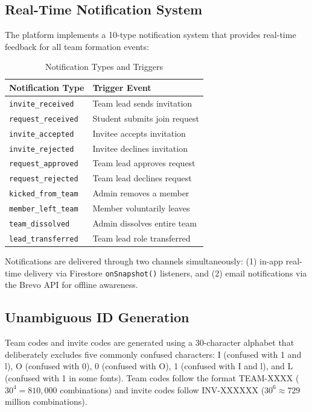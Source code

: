 \documentclass[12pt,a4paper]{article}
\begin{document}
\subsection{Real-Time Notification System}

The platform implements a 10-type notification system that provides real-time feedback for all team formation events:

\begin{table}[H]
\centering
\caption{Notification Types and Triggers}
\begin{tabular}{@{}ll@{}}
\toprule
\textbf{Notification Type} & \textbf{Trigger Event} \\
\midrule
\texttt{invite\_received} & Team lead sends invitation \\
\texttt{request\_received} & Student submits join request \\
\texttt{invite\_accepted} & Invitee accepts invitation \\
\texttt{invite\_rejected} & Invitee declines invitation \\
\texttt{request\_approved} & Team lead approves request \\
\texttt{request\_rejected} & Team lead declines request \\
\texttt{kicked\_from\_team} & Admin removes a member \\
\texttt{member\_left\_team} & Member voluntarily leaves \\
\texttt{team\_dissolved} & Admin dissolves entire team \\
\texttt{lead\_transferred} & Team lead role transferred \\
\bottomrule
\end{tabular}
\end{table}

Notifications are delivered through two channels simultaneously: (1) in-app real-time delivery via Firestore \texttt{onSnapshot()} listeners, and (2) email notifications via the Brevo API for offline awareness.

\subsection{Unambiguous ID Generation}

Team codes and invite codes are generated using a 30-character alphabet that deliberately excludes five commonly confused characters: I (confused with 1 and l), O (confused with 0), 0 (confused with O), 1 (confused with I and l), and L (confused with 1 in some fonts). Team codes follow the format TEAM-XXXX ($30^4 = 810{,}000$ combinations) and invite codes follow INV-XXXXXX ($30^6 \approx 729$ million combinations).
\end{document}
